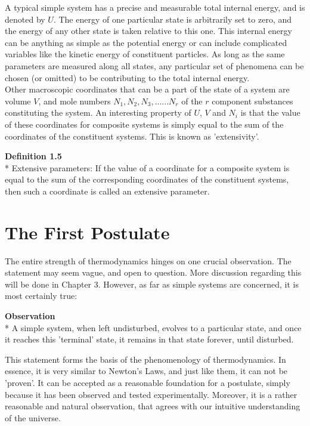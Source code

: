 \documentclass[oneside]{book}
\begin{document}
A typical simple system has a precise and measurable total internal energy, and is denoted by $U$.  The energy of one particular state is arbitrarily set to zero, and the energy of any other state is taken relative to this one. This internal energy can be anything as simple as the potential energy or can include complicated variables like the kinetic energy of constituent particles. As long as the same parameters are measured along all states, any particular set of phenomena can be chosen (or omitted) to be contributing to the total internal energy.\\

Other macroscopic coordinates that can be a part of the state of a system are volume $V$, and mole numbers $N_1, N_2, N_3,......N_r$ of the $r$ component substances constituting the system. An interesting property of $U$, $V$ and $N_i$ is that the value of these coordinates for composite systems is simply equal to the sum of the coordinates of the constituent systems. This is known as 'extensivity'.\\

\begin{mdframed}[style=exercise]
\textbf{Definition 1.5}
\\* Extensive parameters: If the value of a coordinate for a composite system is equal to the sum of the corresponding coordinates of the constituent systems, then such a coordinate is called an extensive parameter. \\ 
\end{mdframed}

\section{The First Postulate}
The entire strength of thermodynamics hinges on one crucial observation. The statement may seem vague, and open to question. More discussion regarding this will be done in Chapter 3. However, as far as simple systems are concerned, it is most certainly true:

\begin{mdframed}[style=exercise]
\textbf{Observation}
\\* A simple system, when left undisturbed, evolves to a particular state, and once it reaches this 'terminal' state, it remains in that state forever, until disturbed.\\ 
\end{mdframed}

This statement forms the basis of the phenomenology of thermodynamics. In essence, it is very similar to Newton's Laws, and just like them, it can not be 'proven'. It can be accepted as a reasonable foundation for a postulate, simply because it has been observed and tested experimentally. Moreover, it is a rather reasonable and natural observation, that agrees with our intuitive understanding of the universe.\\
\end{document}
